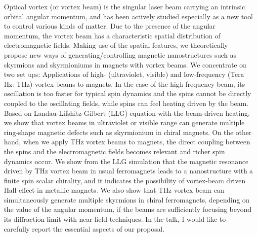 Optical vortex (or vortex beam) is the singular laser beam carrying an intrinsic orbital angular momentum, \cite{Allen_1992} and has been actively studied especially as a new tool to control various kinds of matter. Due to the presence of the angular momentum, the vortex beam has a characteristic spatial distribution of electromagnetic fields. Making use of the spatial features, we theoretically propose new ways of generating/controlling magnetic nanostructures such as skyrmions and skyrmioniums \cite{Fert_2013} in magnets with vortex beams. We concentrate on two set ups: Applications of high- (ultraviolet, visible) and low-frequency (Tera Hz: THz) vortex beams to magnets. In the case of the high-frequency beam, its oscillation is too faster for typical spin dynamics and the spins cannot be directly coupled to the oscillating fields, while spins can feel heating driven by the beam. Based on Landau-Lifshitz-Gilbert (LLG) equation with the beam-driven heating, we show that vortex beams in ultraviolet or visible range can generate multiple ring-shape magnetic defects such as skyrmionium in chiral magnets. \cite{Fujita_2017} On the other hand, when we apply THz vortex beams to magnets, the direct coupling between the spins and the electromagnetic fields becomes relevant and richer spin dynamics occur. We show from the LLG simulation that the magnetic resonance driven by THz vortex beam in usual ferromagnets leads to a nanostructure with a finite spin scalar chirality, \cite{Fujita_2017a} and it indicates the possibility of vortex-beam driven Hall effect in metallic magnets. We also show that THz vortex beam can simultaneously generate multiple skyrmions in chiral ferromagnets, depending on the value of the angular momentum, \cite{Fujita_2017a} if the beams are sufficiently focusing beyond its diffraction limit with near-field techniques. In the talk, I would like to carefully report the essential aspects of our proposal.